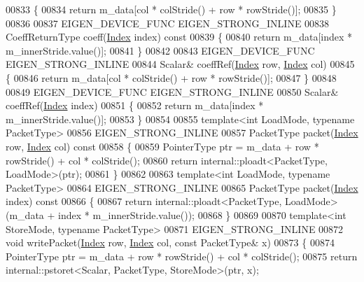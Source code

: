 \begin{DoxyCode}
00833 \textcolor{keyword}{  }\{
00834     \textcolor{keywordflow}{return} m\_data[col * colStride() + row * rowStride()];
00835   \}
00836 
00837   EIGEN\_DEVICE\_FUNC EIGEN\_STRONG\_INLINE
00838   CoeffReturnType coeff(\hyperlink{namespace_eigen_a62e77e0933482dafde8fe197d9a2cfde}{Index} index)\textcolor{keyword}{ const}
00839 \textcolor{keyword}{  }\{
00840     \textcolor{keywordflow}{return} m\_data[index * m\_innerStride.value()];
00841   \}
00842 
00843   EIGEN\_DEVICE\_FUNC EIGEN\_STRONG\_INLINE
00844   Scalar& coeffRef(\hyperlink{namespace_eigen_a62e77e0933482dafde8fe197d9a2cfde}{Index} row, \hyperlink{namespace_eigen_a62e77e0933482dafde8fe197d9a2cfde}{Index} col)
00845   \{
00846     \textcolor{keywordflow}{return} m\_data[col * colStride() + row * rowStride()];
00847   \}
00848 
00849   EIGEN\_DEVICE\_FUNC EIGEN\_STRONG\_INLINE
00850   Scalar& coeffRef(\hyperlink{namespace_eigen_a62e77e0933482dafde8fe197d9a2cfde}{Index} index)
00851   \{
00852     \textcolor{keywordflow}{return} m\_data[index * m\_innerStride.value()];
00853   \}
00854 
00855   \textcolor{keyword}{template}<\textcolor{keywordtype}{int} LoadMode, \textcolor{keyword}{typename} PacketType>
00856   EIGEN\_STRONG\_INLINE
00857   PacketType packet(\hyperlink{namespace_eigen_a62e77e0933482dafde8fe197d9a2cfde}{Index} row, \hyperlink{namespace_eigen_a62e77e0933482dafde8fe197d9a2cfde}{Index} col)\textcolor{keyword}{ const}
00858 \textcolor{keyword}{  }\{
00859     PointerType ptr = m\_data + row * rowStride() + col * colStride();
00860     \textcolor{keywordflow}{return} internal::ploadt<PacketType, LoadMode>(ptr);
00861   \}
00862 
00863   \textcolor{keyword}{template}<\textcolor{keywordtype}{int} LoadMode, \textcolor{keyword}{typename} PacketType>
00864   EIGEN\_STRONG\_INLINE
00865   PacketType packet(\hyperlink{namespace_eigen_a62e77e0933482dafde8fe197d9a2cfde}{Index} index)\textcolor{keyword}{ const}
00866 \textcolor{keyword}{  }\{
00867     \textcolor{keywordflow}{return} internal::ploadt<PacketType, LoadMode>(m\_data + index * m\_innerStride.value());
00868   \}
00869 
00870   \textcolor{keyword}{template}<\textcolor{keywordtype}{int} StoreMode, \textcolor{keyword}{typename} PacketType>
00871   EIGEN\_STRONG\_INLINE
00872   \textcolor{keywordtype}{void} writePacket(\hyperlink{namespace_eigen_a62e77e0933482dafde8fe197d9a2cfde}{Index} row, \hyperlink{namespace_eigen_a62e77e0933482dafde8fe197d9a2cfde}{Index} col, \textcolor{keyword}{const} PacketType& x)
00873   \{
00874     PointerType ptr = m\_data + row * rowStride() + col * colStride();
00875     \textcolor{keywordflow}{return} internal::pstoret<Scalar, PacketType, StoreMode>(ptr, x);

\end{DoxyCode}
